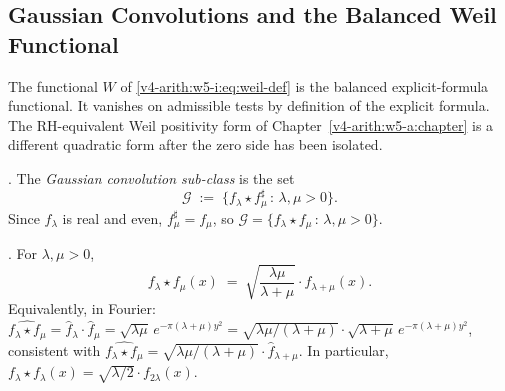 \subsection{Gaussian Convolutions and the Balanced Weil Functional}
\label{v4-arith:w5-i:positivity-test}

The functional \(W\) of \eqref{v4-arith:w5-i:eq:weil-def} is the
balanced explicit-formula functional. It vanishes on admissible tests by
definition of the explicit formula. The RH-equivalent Weil positivity
form of Chapter~\ref{v4-arith:w5-a:chapter} is a different quadratic
form after the zero side has been isolated.

\begin{definition}
\label{v4-arith:w5-i:def:gauss-conv-class}
\ClaimStatusDefinitional. The \emph{Gaussian convolution sub-class}
is the set
\[
\mathcal{G}\;:=\;\{f_{\lambda}\star f_{\mu}^{\sharp}\,:\,\lambda,\mu>0\}.
\]
Since \(f_{\lambda}\) is real and even, \(f_{\mu}^{\sharp}=f_{\mu}\), so
\(\mathcal{G}=\{f_{\lambda}\star f_{\mu}\,:\,\lambda,\mu>0\}\).
\end{definition}

\begin{lemma}
\label{v4-arith:w5-i:lem:gauss-conv}
\ClaimStatusProvedHere. For \(\lambda,\mu>0\),
\begin{equation}
\label{v4-arith:w5-i:eq:gauss-conv}
f_{\lambda}\star f_{\mu}(x)\;=\;\sqrt{\frac{\lambda\mu}{\lambda+\mu}}\cdot f_{\lambda+\mu}(x).
\end{equation}
Equivalently, in Fourier:
\(\widehat{f_{\lambda}\star f_{\mu}}=\widehat{f}_{\lambda}\cdot\widehat{f}_{\mu}=\sqrt{\lambda\mu}\,e^{-\pi(\lambda+\mu)y^{2}}=\sqrt{\lambda\mu/({\lambda+\mu})}\cdot\sqrt{\lambda+\mu}\,e^{-\pi(\lambda+\mu)y^{2}}\),
consistent with \(\widehat{f_{\lambda}\star f_{\mu}}=\sqrt{\lambda\mu/(\lambda+\mu)}\cdot\widehat{f}_{\lambda+\mu}\). In particular,
\(f_{\lambda}\star f_{\lambda}(x)=\sqrt{\lambda/2}\cdot f_{2\lambda}(x)\).
\end{lemma}

